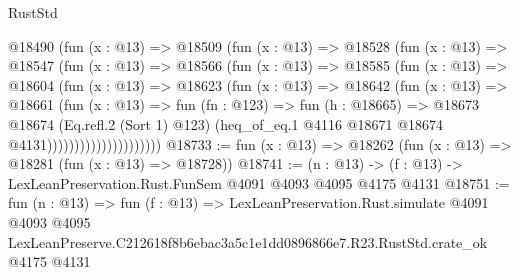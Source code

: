 \begin{lexlean}{RustStd}
\begin{coremodule}
                      @18490
                        (fun (x : @13) =>
                        @18509
                          (fun (x : @13) =>
                          @18528
                            (fun (x : @13) =>
                            @18547
                              (fun (x : @13) =>
                              @18566
                                (fun (x : @13) =>
                                @18585
                                  (fun (x : @13) =>
                                  @18604
                                    (fun (x : @13) =>
                                    @18623
                                      (fun (x : @13) =>
                                      @18642
                                        (fun (x : @13) =>
                                        @18661
                                          (fun (x : @13) =>
                                          fun (fn : @123) =>
                                          fun (h : @18665) =>
                                          @18673
                                            @18674
                                            (Eq.refl.{2} (Sort 1) @123)
                                            (heq_of_eq.{1}
                                              @4116
                                              @18671
                                              @18674
                                              @4131)))))))))))))))))))))
@18733 := fun (x : @13) => @18262 (fun (x : @13) => @18281 (fun (x : @13) => @18728))
@18741 := (n : @13) -> (f : @13) -> LexLeanPreservation.Rust.FunSem @4091 @4093 @4095 @4175 @4131
@18751 := fun (n : @13) =>
  fun (f : @13) =>
  LexLeanPreservation.Rust.simulate
    @4091
    @4093
    @4095
    LexLeanPreserve.C212618f8b6ebac3a5c1e1dd0896866e7.R23.RustStd.crate_ok
    @4175
    @4131
\end{coremodule}
\end{lexlean}
